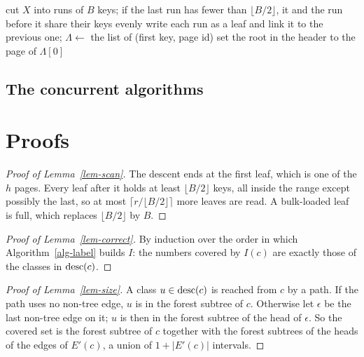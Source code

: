 \begin{algorithm}[h]
\caption{\textsc{BulkLoad}$(X)$ for a sorted set $X$ of unique keys}\label{alg-bulk}
\small
cut $X$ into runs of $B$ keys; if the last run has fewer than $\lfloor B/2\rfloor$, it and the run before it share their keys evenly\;
write each run as a leaf and link it to the previous one; $\Lambda \gets$ the list of (first key, page id)\;
set the root in the header to the page of $\Lambda[0]$\;
\end{algorithm}

\iffull
\subsection{The concurrent algorithms}

\fi

\iffull\else
\section{Proofs}
\label{apx-proofs}

\begin{proof}[Proof of Lemma~\ref{lem-scan}]
The descent ends at the first leaf, which is one of the $h$ pages.
Every leaf after it holds at least $\lfloor B/2\rfloor$ keys, all inside the range
except possibly the last, so at most $\lceil r/\lfloor B/2\rfloor\rceil$ more leaves
are read.
A bulk-loaded leaf is full, which replaces $\lfloor B/2\rfloor$ by $B$.
\end{proof}

\begin{proof}[Proof of Lemma~\ref{lem-correct}]
By induction over the order in which Algorithm~\ref{alg-label} builds $I$: the
numbers covered by $I(c)$ are exactly those of the classes in $\mathrm{desc}(c)$.
\end{proof}

\begin{proof}[Proof of Lemma~\ref{lem-size}]
A class $u\in\mathrm{desc}(c)$ is reached from $c$ by a path.
If the path uses no non-tree edge, $u$ is in the forest subtree of $c$.
Otherwise let $\epsilon$ be the last non-tree edge on it; $u$ is then in the forest
subtree of the head of $\epsilon$.
So the covered set is the forest subtree of $c$ together with the forest subtrees
of the heads of the edges of $E'(c)$, a union of $1+|E'(c)|$ intervals.
\end{proof}

